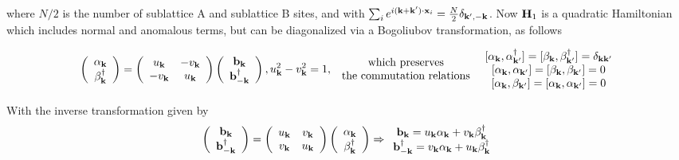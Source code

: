 \documentclass{homework}
\begin{document}
where $N/2$ is the number of sublattice A and sublattice B sites, and with $\sum_{i} e^{i ({\bf k+k'}) \cdot {\bf x}_i} = \frac{N}{2} \delta_{{\bf k',-k}}$. Now ${\bf H}_1$ is a quadratic Hamiltonian which includes normal and anomalous terms, but can be diagonalized via a Bogoliubov transformation, as follows 

\begin{equation}
    \left( \begin{array}{c}
     \alpha_{{\bf k}} \\
     \beta_{{\bf k}}^\dagger
\end{array} \right) = \left(\begin{array}{cc}
   u_{{\bf k}}  & -v_{{\bf k}} \\
   -v_{{\bf k}}  & u_{{\bf k}}
\end{array} \right) \left(\begin{array}{c}
   {\bf b}_{{\bf k}}   \\
    {\bf b}^\dagger_{-{\bf k}} 
\end{array} \right), u^2_{{\bf k}} - v^2_{{\bf k}} = 1,
\begin{array}{cc}
     \textnormal{ which preserves  } \\
     \textnormal{ the commutation relations }
\end{array} \begin{array}{c}
     \textnormal{[}\alpha_{{\bf k}}, \alpha^\dagger_{{\bf k}'}\textnormal{]} = \textnormal{[}\beta_{{\bf k}}, \beta^\dagger_{{\bf k}'}\textnormal{]} = \delta_{{\bf k k'}} \\
     \textnormal{[}\alpha_{{\bf k}}, \alpha_{{\bf k}'}\textnormal{]} = [\beta_{{\bf k}}, \beta_{{\bf k}'}\textnormal{]} = 0 \\
     \textnormal{[}\alpha_{{\bf k}}, \beta_{{\bf k}'}\textnormal{]} = \textnormal{[}\alpha_{{\bf k}}, \alpha_{{\bf k}'}\textnormal{]} = 0
\end{array}
\end{equation} 

With the inverse transformation given by 
\begin{equation}
    \left( \begin{array}{c}
     {\bf b}_{{\bf k}} \\
     {\bf b}_{{\bf -k}}^\dagger
\end{array} \right) = \left(\begin{array}{cc}
   u_{{\bf k}} & v_{{\bf k}} \\
   v_{{\bf k}} & u_{{\bf k}}
\end{array} \right) \left(\begin{array}{c}
   \alpha_{{\bf k}}\\
   \beta_{{\bf k}}^\dagger
\end{array} \right) \Rightarrow \begin{array}{c}
     {\bf b}_{{\bf k}} = u_{{\bf k}} \alpha_{{\bf k}}  + v_{{\bf k}} \beta_{{\bf k}}^\dagger \\
     {\bf b}_{{\bf -k}}^\dagger = v_{{\bf k}} \alpha_{{\bf k}}  + u_{{\bf k}} \beta_{{\bf k}}^\dagger
\end{array}
\end{equation}
\end{document}
